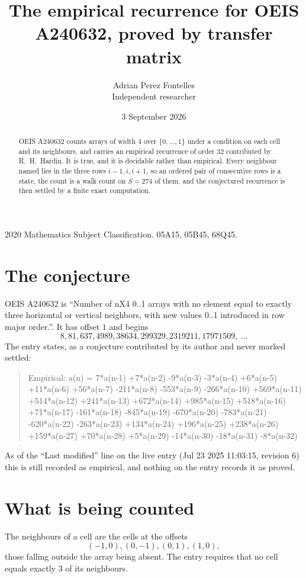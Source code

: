 \documentclass[11pt,a4paper]{article}
\title{The empirical recurrence for OEIS A240632, proved by transfer matrix}
\author{Adrian Perez Fontelles\\ \small Independent researcher}
\date{3 September 2026}
\theoremstyle{plain}
\theoremstyle{definition}
\begin{document}
\maketitle

\begin{abstract}
OEIS A240632 counts arrays of width $4$ over $\{0,\dots,1\}$ under a condition on each cell
and its neighbours, and carries an empirical recurrence of order $32$ contributed by
R.~H.~Hardin. It is true, and it is decidable rather than empirical. Every neighbour named lies
in the three rows $i-1,i,i+1$, so an ordered pair of consecutive rows is a state, the count is
a walk count on $S=274$ of them, and the conjectured recurrence is then settled by a finite
exact computation.
\end{abstract}

\noindent\small 2020 Mathematics Subject Classification. 05A15, 05B45, 68Q45.\normalsize

\section{The conjecture}

OEIS A240632 is ``Number of nX4 0..1 arrays with no element equal to exactly three horizontal or vertical neighbors, with new values 0..1 introduced in row major order.''. It has offset $1$ and begins
\[
8, 81, 637, 4989, 38634, 299329, 2319211, 17971509,\ \dots
\]
The entry states, as a conjecture contributed by its author and never marked settled:
\begin{quote}
Empirical: a(n) = 7*a(n-1) +7*a(n-2) -9*a(n-3) -3*a(n-4) +6*a(n-5) +11*a(n-6) +56*a(n-7) -211*a(n-8) -553*a(n-9) -266*a(n-10) +569*a(n-11) +514*a(n-12) +241*a(n-13) +672*a(n-14) +985*a(n-15) +518*a(n-16) +71*a(n-17) -161*a(n-18) -845*a(n-19) -670*a(n-20) -783*a(n-21) -620*a(n-22) -263*a(n-23) +134*a(n-24) +196*a(n-25) +238*a(n-26) +159*a(n-27) +70*a(n-28) +5*a(n-29) -14*a(n-30) -18*a(n-31) -8*a(n-32)
\end{quote}
As of the ``Last modified'' line on the live entry (Jul 23 2025 11:03:15, revision 6) this is still
recorded as empirical, and nothing on the entry records it as proved.

\section{What is being counted}

The neighbours of a cell are the cells at the offsets
\[
(-1,0), (0,-1), (0,1), (1,0),
\]
those falling outside the array being absent. The entry requires that no cell equals exactly $3$ of its neighbours.
\end{document}

